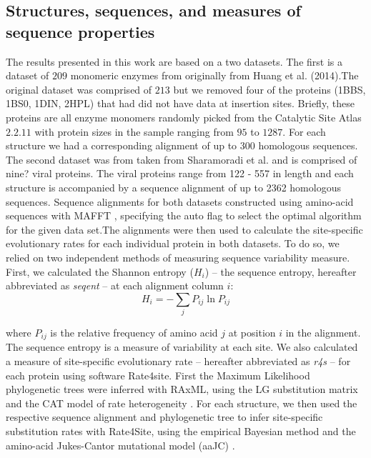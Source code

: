 \documentclass[12pt]{article}
\begin{document}
    \subsection*{Structures, sequences, and measures of sequence properties } 
    The results presented in this work are based on a two datasets. The first is a dataset of $209$ monomeric enzymes from \citep{Echaveetal2015} originally from Huang et al. (2014).The original dataset was comprised of $213$ but we removed four of the proteins (1BBS, 1BS0, 1DIN, 2HPL) that had did not have data at insertion sites. Briefly, these proteins are all enzyme monomers   randomly picked from the Catalytic Site Atlas $2.2.11$ \citep{Porteretal2004} with protein sizes in the sample ranging from $95$ to $1287$. For each structure we had a corresponding alignment of up to 300 homologous sequences.  The second dataset was from taken from Sharamoradi et al. and is comprised of nine? viral proteins. The viral proteins range from 122 - 557 in length and each structure is accompanied by a sequence alignment of up to 2362 homologous sequences. Sequence alignments for both datasets constructed using amino-acid sequences with MAFFT \citep{Katohetal2002, Katohetal2005}, specifying the auto flag to select the optimal algorithm for the given data set.The alignments were then used to calculate the site-specific evolutionary rates for each individual protein in both datasets. To do so, we relied on two independent methods of measuring sequence variability measure. First, we calculated the Shannon entropy ($H_i$) -- the sequence entropy, hereafter abbreviated as {\it seqent} -- at each alignment column $i$:
    \begin{equation}
        \label{eqn:shannon}
        H_i = -\sum_j P_{ij}\ln P_{ij}
    \end{equation}

    where $P_{ij}$ is the relative frequency of amino acid $j$ at position $i$ in the alignment. The sequence entropy is a measure of variability at each site. We also calculated a measure of site-specific evolutionary rate -- hereafter abbreviated as {\it r4s} -- for each protein using software Rate4site. First the Maximum Likelihood phylogenetic trees were inferred with RAxML, using the LG substitution matrix and the CAT model of rate heterogeneity \citep{Stamatakis2006, Stamatakis2014}. For each structure, we then used the respective sequence alignment and phylogenetic tree to infer site-specific substitution rates with Rate4Site, using the empirical Bayesian method and the amino-acid Jukes-Cantor mutational model (aaJC) \citep{Mayroseetal2004}.
\end{document}
